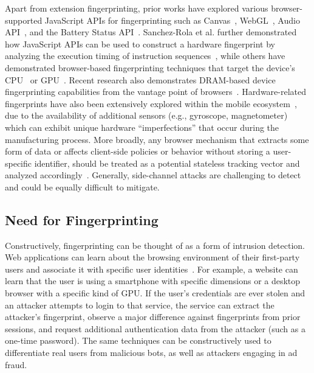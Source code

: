 Apart from extension fingerprinting, prior works have explored various browser-supported JavaScript APIs for fingerprinting such as Canvas~\cite{moweryPixelPerfectFingerprinting2012}, WebGL~\cite{caoCrossBrowserFingerprintingOS2017}, Audio API~\cite{englehardtOnlineTracking1millionsite2016}, and the Battery Status API~\cite{olejnikLeakingBatteryPrivacy2016}. 
%
Sanchez-Rola et al. further demonstrated how JavaScript APIs can be used to construct a hardware fingerprint by analyzing the execution timing of instruction sequences~\cite{sanchez-rolaClockClockTimeBased2018}, while others have demonstrated browser-based fingerprinting techniques that target the device's CPU~\cite{trampertBrowserBasedCPUFingerprinting2022,matyuninTrackingPrivateBrowsing2018} or GPU~\cite{laorDRAWNAPARTDevice2022}. 
%
Recent research also demonstrates DRAM-based device fingerprinting capabilities from the vantage point of browsers~\cite{venugopalanFPRowhammerDRAMBasedDevice2024}.
%
Hardware-related fingerprints have also been extensively explored within the mobile ecosystem~\cite{bojinovMobileDeviceIdentification2014,dasTrackingMobileWeb2016,marcantoniLargescaleStudyRisks2019,hupperichRobustnessMobileDevice2015,deyAccelPrintImperfectionsAccelerometers2014,zhang2019sensorid}, due to the availability of additional sensors (e.g., gyroscope, magnetometer) which can exhibit unique hardware ``imperfections'' that occur during the manufacturing process. 
%
More broadly, any browser mechanism that extracts some form of data or affects client-side policies or behavior without storing a user-specific identifier, should be treated as a potential stateless tracking vector and analyzed accordingly~\cite{aliNavigatingMurkyWaters2023}. 
%
Generally, side-channel attacks are challenging to detect and could be equally difficult to mitigate.


\subsection{Need for Fingerprinting}
\label{sec:need-for-fingerprinting}


Constructively, fingerprinting can be thought of as a form of intrusion detection. 
%
Web applications can learn about the browsing environment of their first-party users and associate it with specific user identities~\cite{LinPhishSheepsClothing2022}. 
%
For example, a website can learn that the user is using a smartphone with specific dimensions or a desktop browser with a specific kind of GPU. 
%
If the user's credentials are ever stolen and an attacker attempts to login to that service, the service can extract the attacker's fingerprint, observe a major difference against fingerprints from prior sessions, and request additional authentication data from the attacker (such as a one-time password).
%
The same techniques can be constructively used to differentiate real users from malicious bots, as well as attackers engaging in ad fraud.

